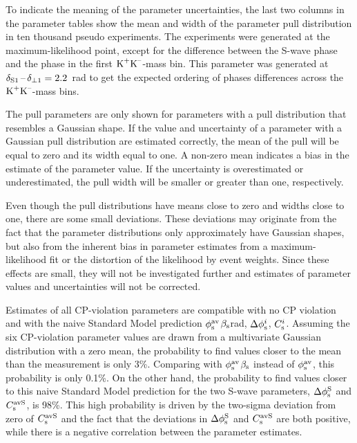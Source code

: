 To indicate the meaning of the parameter uncertainties, the last two columns in the parameter tables show the mean and width of the
parameter pull distribution in ten thousand pseudo experiments. The experiments were generated at the maximum-likelihood point, except for
the difference between the S-wave phase and the \BstoJpsiphi{} phase in the first $\KK$-mass bin. This parameter was generated at
$\delSperp[1]=2.2$~rad to get the expected ordering of phases differences across the $\KK$-mass bins.

The pull parameters are only shown for parameters with a pull distribution that resembles a Gaussian shape. If the value and uncertainty of
a parameter with a Gaussian pull distribution are estimated correctly, the mean of the pull will be equal to zero and its width equal to
one. A non-zero mean indicates a bias in the estimate of the parameter value. If the uncertainty is overestimated or underestimated, the
pull width will be smaller or greater than one, respectively.

Even though the pull distributions have means close to zero and widths close to one, there are some small deviations. These deviations may
originate from the fact that the parameter distributions only approximately have Gaussian shapes, but also from the inherent bias in
parameter estimates from a maximum-likelihood fit or the distortion of the likelihood by event weights. Since these effects are small, they
will not be investigated further and estimates of parameter values and uncertainties will not be corrected.

Estimates of all CP-violation parameters are compatible with no CP violation and with the naive Standard Model prediction
$\phisav$\texteq{}$\bs$\mbox{\textapprox{}\unitsp{}rad}, $\Delphisi$, $\Csi$. Assuming the six \BstoJpsiphi{}
CP-violation parameter values are drawn from a multivariate Gaussian distribution with a zero mean, the probability to find values closer
to the mean than the measurement is only 3\%. Comparing with $\phisav$\texteq{}$\bs$ instead of $\phisav$, this probability is
only 0.1\%. On the other hand, the probability to find values closer to this naive Standard Model prediction for the two S-wave parameters,
$\DelphisS$ and $\CsavS$, is 98\%. This high probability is driven by the two-sigma deviation from zero of $\CsavS$ and the fact that the
deviations in $\DelphisS$ and $\CsavS$ are both positive, while there is a negative correlation between the parameter estimates.

